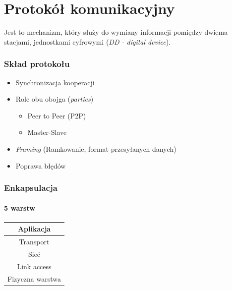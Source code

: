 
\part{Protokół komunikacyjny}
	Jest to mechanizm, który służy do wymiany informacji pomiędzy dwiema stacjami, jednostkami cyfrowymi (\emph{DD - digital device}). 
	\section{Skład protokołu}
		\begin{itemize}
			\item Synchronizacja kooperacji
			\item Role obu obojga (\emph{parties})
			\begin{itemize}
				\item Peer to Peer (P2P)
				\item Master-Slave
			\end{itemize}
			\item \emph{Framing} (Ramkowanie, format przesyłanych danych)
			\item Poprawa błędów
		\end{itemize}
	\section{Enkapsulacja}
		\subsection{5 warstw}
			\begin{table}[h]
				\begin{tabular}{|c|}
					\hline
					Aplikacja        \\ \hline
					Transport        \\ \hline
					Sieć             \\ \hline
					Link access      \\ \hline
					Fizyczna warstwa \\ \hline
				\end{tabular}
			\end{table}
